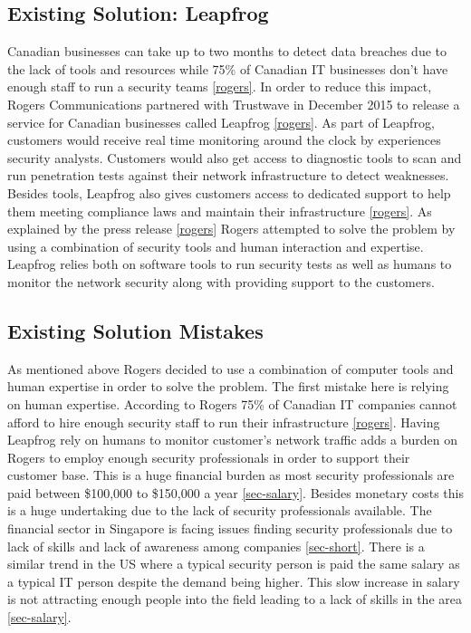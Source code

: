 \documentclass{article}
\begin{document}
\subsection{Existing Solution: Leapfrog}
Canadian businesses can take up to two months to detect data breaches due to the lack of tools and resources while 75\% of Canadian IT businesses don't have enough staff to run a security teams \ref{rogers}. In order to reduce this impact, Rogers Communications partnered with Trustwave in December 2015 to release a service for Canadian businesses called Leapfrog \ref{rogers}. As part of Leapfrog, customers would receive real time monitoring around the clock by experiences security analysts. Customers would also get access to diagnostic tools to scan and run penetration tests against their network infrastructure to detect weaknesses. Besides tools, Leapfrog also gives customers access to dedicated support to help them meeting compliance laws and maintain their infrastructure \ref{rogers}.  As explained by the press release \ref{rogers} Rogers attempted to solve the problem by using a combination of security tools and human interaction and expertise. Leapfrog relies both on software tools to run security tests as well as humans to monitor the network security along with providing support to the customers.

\subsection{Existing Solution Mistakes}
As mentioned above Rogers decided to use a combination of computer tools and human expertise in order to solve the problem. The first mistake here is relying on human expertise. According to Rogers 75\% of Canadian IT companies cannot afford to hire enough security staff to run their infrastructure \ref{rogers}. Having Leapfrog rely on humans to monitor customer's network traffic adds a burden on Rogers to employ enough security professionals in order to support their customer base. This is a huge financial burden as most security professionals are paid between \$100,000 to \$150,000 a year \ref{sec-salary}. Besides monetary costs this is a huge undertaking due to the lack of security professionals available. The financial sector in Singapore is facing issues finding security professionals due to lack of skills and lack of awareness among companies \ref{sec-short}. There is a similar trend in the US where a typical security person is paid the same salary as a typical IT person despite the demand being higher. This slow increase in salary is not attracting enough people into the field leading to a lack of skills in the area \ref {sec-salary}.
\end{document}
